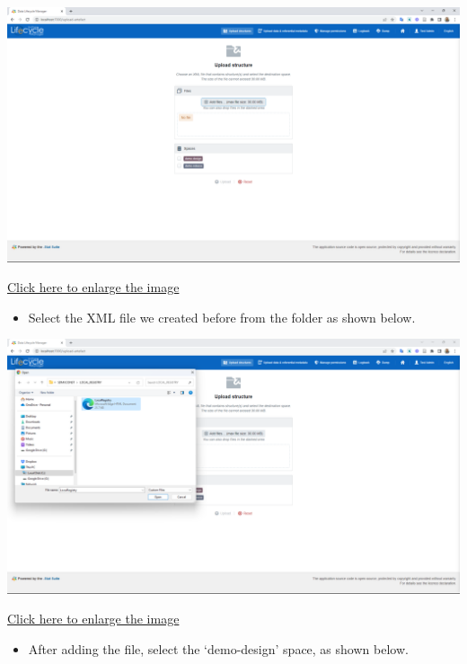 \documentclass[
]{book}
\providecommand{\tightlist}{%
  \setlength{\itemsep}{0pt}\setlength{\parskip}{0pt}}
\begin{document}
\begin{center}\includegraphics[width=1\linewidth]{./images/image194} \end{center}

\href{images/image194.png}{Click here to enlarge the image}

\begin{itemize}
\tightlist
\item
  Select the XML file we created before from the folder as shown below.
\end{itemize}

\begin{center}\includegraphics[width=1\linewidth]{./images/image196} \end{center}

\href{images/image196.png}{Click here to enlarge the image}

\begin{itemize}
\tightlist
\item
  After adding the file, select the `demo-design' space, as shown below.
\end{itemize}
\end{document}
